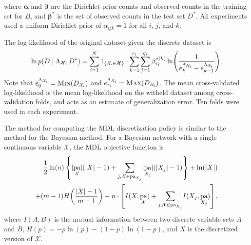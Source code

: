 \documentclass[twoside,11pt]{article}
\newcommand{\paren}[1]{\mathopen{}\mathclose\bgroup\left(#1\aftergroup\egroup\right)}
\newcommand{\brock}[1]{\mathopen{}\mathclose\bgroup\left[#1\aftergroup\egroup\right]}
\newcommand{\curly}[1]{\mathopen{}\mathclose\bgroup\left\{#1\aftergroup\egroup\right\}}
\DeclareMathOperator{\Pa}{pa} %
\newcommand{\cX}{\mathcal{X}} %
\newcommand{\cx}{\mathcal{x}} %
\newcommand{\discset}{\Lambda_{\bm{\cX}}}
\begin{document}
\noindent
where $\bm{\alpha}$ and $\bm{\beta}$ are the Dirichlet prior counts and observed counts in the training set for $B$, and $\bm{\beta}^*$ is the set of observed counts in the test set $D^*$.
All experiments used a uniform Dirichlet prior of $\alpha_{ijk} = 1$ for all $i$, $j$, and $k$.

The log-likelihood of the original dataset given the discrete dataset is
\begin{equation}
  \ln p\paren{D\mid \discset, D^*} = \sum_{i=1}^N
  1_{\curly{ \cX_i \in \bm{\cX }}}\cdot \sum_{k=1}^{r_i}  \sum_{j=1}^{q_i} \beta_{ij}^{*(k)} \ln \paren{
    \frac{
      1
    }{
      e^{\Lambda_{\cX_i}}_{k} - e^{\Lambda_{\cX_i}}_{k-1}
    }
  }\text{.}
\end{equation}
Note that $e^{\Lambda_{\cX_i}}_{0} = \textsc{Min}\paren{D_{\cX_i}}$ and $e^{\Lambda_{\cX_i}}_{r_i} = \textsc{Max}\paren{D_{\cX_i}}$.
\noindent
The mean cross-validated log-likelihood is the mean log-likelihood on the witheld dataset among cross-validation folds, and acts as an estimate of generalization error.
Ten folds were used in each experiment.

The method for computing the MDL discretization policy is similar to the method for the Bayesian method.
For a Bayesian network with a single continuous variable $\cX$, the MDL objective function is
\begin{equation}
  \label{eqn:MDL}
  \begin{aligned}
  \frac{1}{2} \ln(n) \left\lbrace  \lvert \Pa_{\cX} \rvert (\lvert X \rvert - 1) +
   {\sum_{j,\cX \in \Pa_{X_j}}} \lvert \Pa_{X_j} \rvert (\lvert X_j \rvert - 1) \right\rbrace + \ln(|X|) \\
   + (m-1) H \paren{\frac{|X| - 1}{m -1}} -n \cdot \left[ I(X,\Pa_{\cX}) + {\sum_{j,\cX \in \Pa_{X_j}}} I(X_j, \Pa_{X_j}) \right]\text{,}
  \end{aligned}
\end{equation}
where $I(A,B)$ is the mutual information between two discrete variable sets $A$ and $B$, ${H(p) = -p \ln(p) - (1-p) \ln(1-p)}$, and $X$ is the discretized version of $\cX$.
\end{document}
